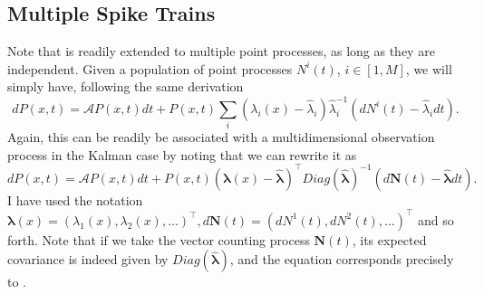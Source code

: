 \subsection{Multiple Spike Trains}

Note that  is readily extended to multiple point processes, as long as they are independent. Given a population of point processes $N^i(t)$, $i\in [1,M]$, we will simply have, following the same derivation
\begin{equation}
\label{eq:snyder_multi}
dP(x,t) = \mathcal{A}P(x,t) dt + P(x,t)\sum_i\left(\lambda_i(x)-\hat{\lambda}_i\right)\hat{\lambda}_i^{-1}\left(dN^i(t)-\hat{\lambda}_i dt\right).
\end{equation}
Again, this can be readily be associated with a multidimensional observation process in the Kalman case by noting that we can rewrite it as
\begin{equation}
\nonumber
dP(x,t) = \mathcal{A}P(x,t) dt + P(x,t)\left(\boldsymbol{\lambda}(x)-\hat{\boldsymbol{\lambda}}\right)^\top Diag(\hat{\boldsymbol{\lambda}})^{-1}\left(d\boldsymbol{N}(t)-\hat{\boldsymbol{\lambda}} dt\right).
\end{equation}
I have used the notation $\boldsymbol{\lambda}(x) = (\lambda_1(x),\lambda_2(x),\ldots)^\top, d\boldsymbol{N}(t) = (dN^1(t), dN^2(t),\ldots)^\top$ and so forth. Note that if we take the vector counting process $\boldsymbol{N}(t)$, its expected covariance is indeed given by $Diag(\hat{\boldsymbol{\lambda}})$, and the equation corresponds precisely to .

